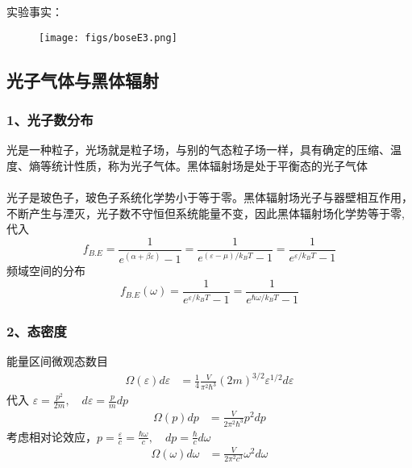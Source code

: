 \begin{frame}
  \frametitle{}
实验事实：
\begin{figure}[htbp]
  \centering
  \texttt{[image: figs/boseE3.png]}
\end{figure}
\end{frame} 

\subsection{光子气体与黑体辐射}
\begin{frame}
  \frametitle{ 1、光子数分布}
    光是一种粒子，光场就是粒子场，与别的气态粒子场一样，具有确定的压缩、温度、熵等统计性质，称为光子气体。黑体辐射场是处于平衡态的光子气体 \\
    ~~\\ 
    光子是玻色子，玻色子系统化学势小于等于零。黑体辐射场光子与器壁相互作用，不断产生与湮灭，光子数不守恒但系统能量不变，因此黑体辐射场化学势等于零, 代入\\
    \[f_{B.E} =  \frac{1}{e^{(\alpha +\beta \varepsilon)}-1} = \frac{1}{e^{(\varepsilon - \mu)/k_B T}-1} = \frac{1}{e^{\varepsilon /k_B T}-1} \]
    频域空间的分布
    \[f_{B.E}(\omega) =  \frac{1}{e^{\varepsilon /k_B T}-1} = \frac{1}{e^{\hbar \omega /k_B T}-1} \] 
\end{frame} 

\begin{frame}
  \frametitle{ 2、态密度}
   能量区间微观态数目 
   \[ 
    \begin{aligned}
      \Omega (\varepsilon) d \varepsilon  
      &=\frac{1}{4} \frac{V}{\pi ^2 \hbar^3} (2m)^{3/2} \varepsilon^{1/2} d \varepsilon 
    \end{aligned}
     \] 
    代入 $\varepsilon = \frac{p^2}{2m}, \quad d \varepsilon = \frac{p}{m} dp $   
    \[ 
      \begin{aligned}
        \Omega (p) d p 
        &= \frac{V}{ 2 \pi ^2 \hbar^3} p^2  dp
      \end{aligned}
       \]
    考虑相对论效应，$p = \frac{\varepsilon}{c} =  \frac{\hbar\omega}{c}, \quad dp = \frac{\hbar}{c} d\omega$
    \[ 
    \begin{aligned}
         \Omega (\omega) d \omega 
         &= \frac{V}{2\pi ^2c^3} \omega^2  d \omega
       \end{aligned}
    \]       
\end{frame} 


